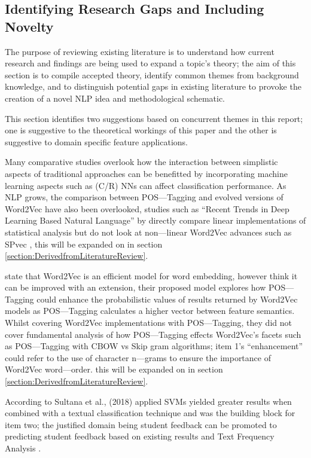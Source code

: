 \subsection{Identifying Research Gaps and Including Novelty} \label{section:IdentifyingResearchGapsandIncludingNovelty}

The purpose of reviewing existing literature is to understand how current research and findings are being used to expand a topic’s theory; the aim of this section is to compile accepted theory, identify common themes from background knowledge, and to distinguish potential gaps in existing literature to provoke the creation of a novel NLP idea and methodological schematic.

This section identifies two suggestions based on concurrent themes in this report; one is suggestive to the theoretical workings of this paper and the other is suggestive to domain specific feature applications.

Many comparative studies overlook how the interaction between simplistic aspects of traditional approaches can be benefitted by incorporating machine learning aspects such as (C/R) NNs can affect classification performance. As NLP grows, the comparison between POS---Tagging and evolved versions of Word2Vec have also been overlooked, studies such as “Recent Trends in Deep Learning Based Natural Language” by \parencite{young2018recent} directly compare linear implementations of statistical analysis but do not look at non---linear Word2Vec advances such as SPvec \parencite{zhang2020spvec}, this will be expanded on in section \ref{section:DerivedfromLiteratureReview}.

\textcite{suleiman2019using} state that Word2Vec is an efficient model for word embedding, however think it can be improved with an extension, their proposed model explores how POS---Tagging could enhance the probabilistic values of results returned by Word2Vec models as POS---Tagging calculates a higher vector between feature semantics. Whilst covering Word2Vec implementations with POS---Tagging, they did not cover fundamental analysis of how POS---Tagging effects Word2Vec’s facets such as POS---Tagging with CBOW vs Skip gram algorithms; item 1’s “enhancement” could refer to the use of character n---grams to ensure the importance of Word2Vec word---order. this will be expanded on in section \ref{section:DerivedfromLiteratureReview}.

According to Sultana et al., (2018) applied SVMs yielded greater results when combined with a textual classification technique and was the building block for item two; the justified domain being student feedback can be promoted to predicting student feedback based on existing results and Text Frequency Analysis \parencite{alqurashi2019predicting}.

